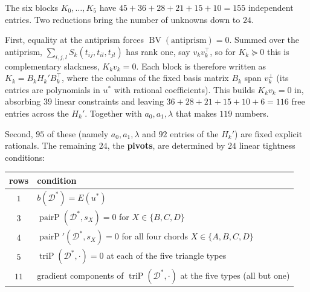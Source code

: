\documentclass[11pt]{article}
\theoremstyle{definition}
\theoremstyle{remark}
\newcommand{\energy}{E}
\newcommand{\pairP}{\operatorname{pairP}}
\newcommand{\triP}{\operatorname{triP}}
\newcommand{\BV}{\operatorname{BV}}
\begin{document}
The six blocks $K_0,\ldots,K_5$ have $45+36+28+21+15+10=155$ independent
entries. Two reductions bring the number of unknowns down to $24$.

First, equality at the antiprism forces $\BV(\mathrm{antiprism})=0$. Summed
over the antiprism, $\sum_{i,j,l}S_k(t_{ij},t_{il},t_{jl})$ has rank one,
say $v_kv_k^\top$, so for $K_k\succeq0$ this is complementary slackness,
$K_kv_k=0$. Each block is therefore written as
$K_k = B_k H_k' B_k^\top$, where the columns of the fixed basis matrix
$B_k$ span $v_k^\perp$ (its entries are polynomials in $u^*$ with
rational coefficients). This builds $K_kv_k=0$ in, absorbing $39$ linear
constraints and leaving $36+28+21+15+10+6=116$ free entries across the
$H_k'$. Together with $a_0,a_1,\lambda$ that makes $119$ numbers.

Second, $95$ of these (namely $a_0,a_1,\lambda$ and $92$ entries of the
$H_k'$) are fixed explicit rationals. The remaining $24$, the
\textbf{pivots}, are determined by $24$ linear tightness conditions:

\begin{center}
\begin{tabular}{cl}
  \toprule
  rows & condition \\
  \midrule
  $1$  & $b(\mathcal{D}^*) = \energy(u^*)$ \\
  $3$  & $\pairP(\mathcal{D}^*,s_X) = 0$ for $X \in \{B,C,D\}$ \\
  $4$  & $\pairP'(\mathcal{D}^*,s_X) = 0$ for all four chords $X \in \{A,B,C,D\}$ \\
  $5$  & $\triP(\mathcal{D}^*,\cdot) = 0$ at each of the five triangle types \\
  $11$ & gradient components of $\triP(\mathcal{D}^*,\cdot)$ at the five types (all but one) \\
  \bottomrule
\end{tabular}
\end{center}
\end{document}
